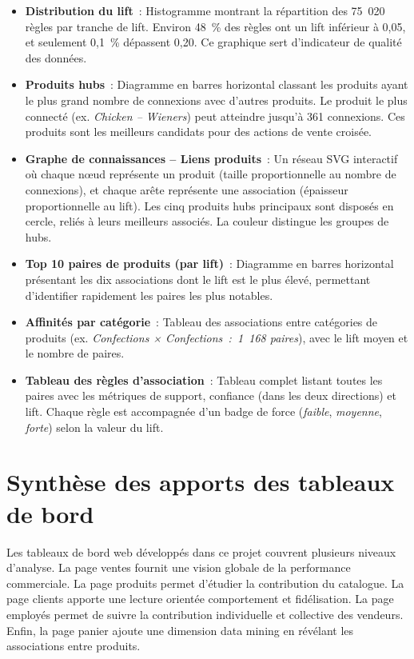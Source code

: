 \documentclass[12pt,a4paper,twoside]{report}
\begin{document}
\begin{itemize}
  \item \textbf{Distribution du lift}~: Histogramme montrant la répartition des 75~020 règles par tranche de lift. Environ 48~\% des règles ont un lift inférieur à 0,05, et seulement 0,1~\% dépassent 0,20. Ce graphique sert d'indicateur de qualité des données.
  
  \item \textbf{Produits hubs}~: Diagramme en barres horizontal classant les produits ayant le plus grand nombre de connexions avec d'autres produits. Le produit le plus connecté (ex. \textit{Chicken -- Wieners}) peut atteindre jusqu'à 361 connexions. Ces produits sont les meilleurs candidats pour des actions de vente croisée.
  
  \item \textbf{Graphe de connaissances -- Liens produits}~: Un réseau SVG interactif où chaque nœud représente un produit (taille proportionnelle au nombre de connexions), et chaque arête représente une association (épaisseur proportionnelle au lift). Les cinq produits hubs principaux sont disposés en cercle, reliés à leurs meilleurs associés. La couleur distingue les groupes de hubs.
  
  \item \textbf{Top 10 paires de produits (par lift)}~: Diagramme en barres horizontal présentant les dix associations dont le lift est le plus élevé, permettant d'identifier rapidement les paires les plus notables.
  
  \item \textbf{Affinités par catégorie}~: Tableau des associations entre catégories de produits (ex. \textit{Confections × Confections~:~1~168 paires}), avec le lift moyen et le nombre de paires.
  
  \item \textbf{Tableau des règles d'association}~: Tableau complet listant toutes les paires avec les métriques de support, confiance (dans les deux directions) et lift. Chaque règle est accompagnée d'un badge de force (\textit{faible}, \textit{moyenne}, \textit{forte}) selon la valeur du lift.
\end{itemize}

\section{Synthèse des apports des tableaux de bord}

Les tableaux de bord web développés dans ce projet couvrent plusieurs niveaux d'analyse. La page ventes fournit une vision globale de la performance commerciale. La page produits permet d'étudier la contribution du catalogue. La page clients apporte une lecture orientée comportement et fidélisation. La page employés permet de suivre la contribution individuelle et collective des vendeurs. Enfin, la page panier ajoute une dimension data mining en révélant les associations entre produits.
\end{document}
